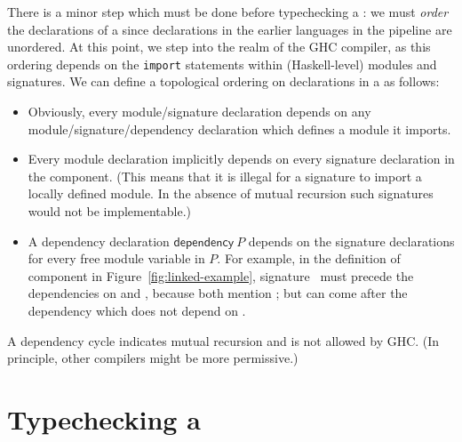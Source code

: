 There is a minor step which must be done before typechecking a
\unit{}: we must \emph{order} the declarations of a \unit{} since declarations in the
earlier languages in the pipeline are unordered.  At this point,
we step into the realm of the GHC compiler, as this ordering depends
on the \texttt{import} statements within (Haskell-level) modules and
signatures.  We can define a topological ordering on declarations in a
\unit{} as follows:

\begin{itemize}
    \item Obviously, every module/signature declaration depends on
    any module/signature/dependency declaration which defines a
    module it imports.
    \item Every module declaration implicitly depends on every signature
    declaration in the component.  (This means that it is illegal for a
    signature to import a locally defined module.  In the absence of
    mutual recursion such signatures would not be implementable.)
    \item A dependency declaration $\textsf{dependency}~P$ depends
    on the signature declarations for every free module variable
    in $P$.  For example, in the definition of component  in
    Figure~\ref{fig:linked-example},
    \textsf{signature}~ must precede the dependencies
    on  and , because both mention ; but
    can come after the  dependency which does not
    depend on .

\end{itemize}
%
A dependency cycle indicates mutual recursion and is not allowed by GHC.
(In principle, other compilers might be more permissive.)

\section{Typechecking a \unit{}}
\label{sec:overview-compiler}


